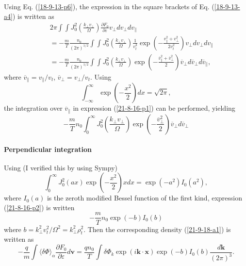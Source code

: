\documentclass{llncs}
\begin{document}
Using Eq. (\ref{18-9-13-p6}), the expression in the square brackets of Eq.
(\ref{18-9-13-a4}) is written as
\begin{eqnarray}
  &  & 2 \pi \int \int J_0^2 \left( \frac{k_{\perp} v_{\perp}}{\Omega}
  \right) \frac{\partial F_0}{\partial \varepsilon} v_{\perp} d v_{\perp} d
  v_{\parallel} \nonumber\\
  &  & = - \frac{m}{T} \frac{n_0}{(2 \pi)^{1 / 2}} \int \int J_0^2 \left(
  \frac{k_{\perp} v_{\perp}}{\Omega} \right) \frac{1}{v_t^3} \exp \left( -
  \frac{v^2_{\parallel} + v_{\perp}^2}{2 v_t^2} \right) v_{\perp} d v_{\perp}
  d v_{\parallel} \\
  &  & = - \frac{m}{T} \frac{n_0}{(2 \pi)^{1 / 2}} \int \int J_0^2 \left(
  \frac{k_{\perp} v_{\perp}}{\Omega} \right) \exp \left( -
  \frac{\overline{v}^2_{\parallel} + \overline{v}_{\perp}^2}{2} \right)
  \overline{v}_{\perp} d \overline{v}_{\perp} d \overline{v}_{\parallel}, 
  \label{21-8-16-p1}
\end{eqnarray}
where $\overline{v}_{\parallel} = v_{\parallel} / v_t$, $\overline{v}_{\perp}
= v_{\perp} / v_t$. Using
\begin{equation}
  \int_{- \infty}^{\infty} \exp \left( - \frac{x^2}{2} \right) d x = \sqrt{2
  \pi},
\end{equation}
the integration over $\overline{v}_{\parallel}$ in expression
(\ref{21-8-16-p1}) can be performed, yielding
\begin{equation}
  \label{21-8-16-p2} - \frac{m}{T} n_0 \int_0^{\infty} J_0^2 \left(
  \frac{k_{\perp} v_{\perp}}{\Omega} \right) \exp \left( -
  \frac{\overline{v}_{\perp}^2}{2} \right) \overline{v}_{\perp} d
  \overline{v}_{\perp}
\end{equation}

\paragraph{Perpendicular integration}

Using (I verified this by using Sympy)
\begin{equation}
  \int_0^{\infty} J_0^2 (a x) \exp \left( - \frac{x^2}{2} \right) x d x = \exp
  (- a^2) I_0 (a^2),
\end{equation}
where $I_0 (a)$ is the zeroth modified Bessel function of the first kind,
expression (\ref{21-8-16-p2}) is written
\begin{equation}
  - \frac{m}{T} n_0 \exp (- b) I_0 (b)
\end{equation}
where $b = k_{\perp}^2 v_t^2 / \Omega^2 = k_{\perp}^2 \rho^2_t$. Then the
corresponding density (\ref{21-9-18-a1}) is written as
\begin{equation}
  \label{18-9-13-p7} - \frac{q}{m} \int \langle \delta \Phi \rangle_{\alpha}
  \frac{\partial F_0}{\partial \varepsilon} d\mathbf{v}= \frac{q n_0}{T}  \int
  \delta \Phi_k \exp (i\mathbf{k} \cdot \mathbf{x}) \exp (- b) I_0 (b)
  \frac{d\mathbf{k}}{(2 \pi)^3} .
\end{equation}
\end{document}
